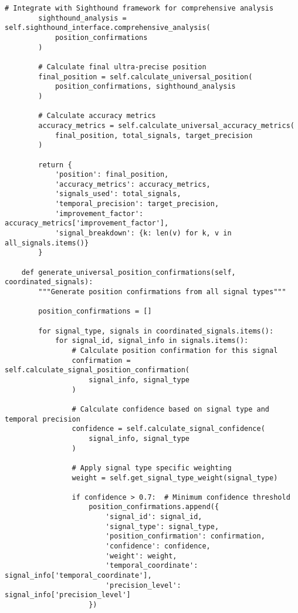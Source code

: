 \documentclass[12pt,a4paper]{article}
\begin{document}
\begin{lstlisting}[style=pythonstyle, caption=Universal Signal Integration for GPS Enhancement]
        # Integrate with Sighthound framework for comprehensive analysis
        sighthound_analysis = self.sighthound_interface.comprehensive_analysis(
            position_confirmations
        )
        
        # Calculate final ultra-precise position
        final_position = self.calculate_universal_position(
            position_confirmations, sighthound_analysis
        )
        
        # Calculate accuracy metrics
        accuracy_metrics = self.calculate_universal_accuracy_metrics(
            final_position, total_signals, target_precision
        )
        
        return {
            'position': final_position,
            'accuracy_metrics': accuracy_metrics,
            'signals_used': total_signals,
            'temporal_precision': target_precision,
            'improvement_factor': accuracy_metrics['improvement_factor'],
            'signal_breakdown': {k: len(v) for k, v in all_signals.items()}
        }
    
    def generate_universal_position_confirmations(self, coordinated_signals):
        """Generate position confirmations from all signal types"""
        
        position_confirmations = []
        
        for signal_type, signals in coordinated_signals.items():
            for signal_id, signal_info in signals.items():
                # Calculate position confirmation for this signal
                confirmation = self.calculate_signal_position_confirmation(
                    signal_info, signal_type
                )
                
                # Calculate confidence based on signal type and temporal precision
                confidence = self.calculate_signal_confidence(
                    signal_info, signal_type
                )
                
                # Apply signal type specific weighting
                weight = self.get_signal_type_weight(signal_type)
                
                if confidence > 0.7:  # Minimum confidence threshold
                    position_confirmations.append({
                        'signal_id': signal_id,
                        'signal_type': signal_type,
                        'position_confirmation': confirmation,
                        'confidence': confidence,
                        'weight': weight,
                        'temporal_coordinate': signal_info['temporal_coordinate'],
                        'precision_level': signal_info['precision_level']
                    })
        

\end{lstlisting}
\end{document}
